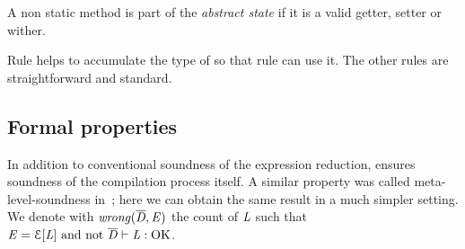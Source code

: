 \noindent A non static method is part of the \emph{abstract state} if 
it is a valid getter, setter or wither.


Rule  helps to accumulate the type of \Q@this@ so that rule 
can use it.
The other rules are straightforward and standard.

\subsection{Formal properties}
In addition to conventional soundness of the expression reduction,
\name ensures soundness of the compilation process itself.
A similar property was called meta-level-soundness in~\cite{servetto2014meta}; here we can obtain the same result in
a much simpler setting.
We denote with $\mathit{wrong}(\overline{\mathit{D}},\mathit{E})$ the count of $\mathit{L}$ such that
$\mE=\ctx[\mL]\ \text{and not}\ \overline\mD\vdash\mL:\text{OK}$.

